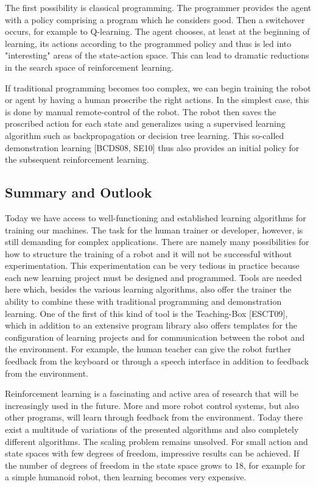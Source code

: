 \documentclass[10pt]{article}
\begin{document}
The first possibility is classical programming. The programmer provides the agent with a policy comprising a program which he considers good. Then a switchover occurs, for example to Q-learning. The agent chooses, at least at the beginning of learning, its actions according to the programmed policy and thus is led into "interesting" areas of the state-action space. This can lead to dramatic reductions in the search space of reinforcement learning.

If traditional programming becomes too complex, we can begin training the robot or agent by having a human proscribe the right actions. In the simplest case, this is done by manual remote-control of the robot. The robot then saves the proscribed action for each state and generalizes using a supervised learning algorithm such as backpropagation or decision tree learning. This so-called demonstration learning [BCDS08, SE10] thus also provides an initial policy for the subsequent reinforcement learning.

\subsection*{Summary and Outlook}
Today we have access to well-functioning and established learning algorithms for training our machines. The task for the human trainer or developer, however, is still demanding for complex applications. There are namely many possibilities for how to structure the training of a robot and it will not be successful without experimentation. This experimentation can be very tedious in practice because each new learning project must be designed and programmed. Tools are needed here which, besides the various learning algorithms, also offer the trainer the ability to combine these with traditional programming and demonstration learning. One of the first of this kind of tool is the Teaching-Box [ESCT09], which in addition to an extensive program library also offers templates for the configuration of learning projects and for communication between the robot and the environment. For example, the human teacher can give the robot further feedback from the keyboard or through a speech interface in addition to feedback from the environment.

Reinforcement learning is a fascinating and active area of research that will be increasingly used in the future. More and more robot control systems, but also other programs, will learn through feedback from the environment. Today there exist a multitude of variations of the presented algorithms and also completely different algorithms. The scaling problem remains unsolved. For small action and state spaces with few degrees of freedom, impressive results can be achieved. If the number of degrees of freedom in the state space grows to 18, for example for a simple humanoid robot, then learning becomes very expensive.
\end{document}

